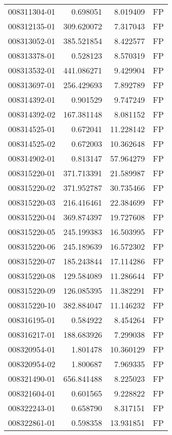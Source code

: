 \begin{tabular}{lrrl}
008311304-01 &    0.698051 &     8.019409 &   FP \\
008312135-01 &  309.620072 &     7.317043 &   FP \\
008313052-01 &  385.521854 &     8.422577 &   FP \\
008313378-01 &    0.528123 &     8.570319 &   FP \\
008313532-01 &  441.086271 &     9.429904 &   FP \\
008313697-01 &  256.429693 &     7.892789 &   FP \\
008314392-01 &    0.901529 &     9.747249 &   FP \\
008314392-02 &  167.381148 &     8.081152 &   FP \\
008314525-01 &    0.672041 &    11.228142 &   FP \\
008314525-02 &    0.672003 &    10.362648 &   FP \\
008314902-01 &    0.813147 &    57.964279 &   FP \\
008315220-01 &  371.713391 &    21.589987 &   FP \\
008315220-02 &  371.952787 &    30.735466 &   FP \\
008315220-03 &  216.416461 &    22.384699 &   FP \\
008315220-04 &  369.874397 &    19.727608 &   FP \\
008315220-05 &  245.199383 &    16.503995 &   FP \\
008315220-06 &  245.189639 &    16.572302 &   FP \\
008315220-07 &  185.243844 &    17.114286 &   FP \\
008315220-08 &  129.584089 &    11.286644 &   FP \\
008315220-09 &  126.085395 &    11.382291 &   FP \\
008315220-10 &  382.884047 &    11.146232 &   FP \\
008316195-01 &    0.584922 &     8.454264 &   FP \\
008316217-01 &  188.683926 &     7.299038 &   FP \\
008320954-01 &    1.801478 &    10.360129 &   FP \\
008320954-02 &    1.800687 &     7.969335 &   FP \\
008321490-01 &  656.841488 &     8.225023 &   FP \\
008321604-01 &    0.601565 &     9.228822 &   FP \\
008322243-01 &    0.658790 &     8.317151 &   FP \\
008322861-01 &    0.598358 &    13.931851 &   FP \\

\end{tabular}
